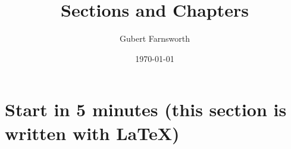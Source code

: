 \documentclass{article}
\title{Sections and Chapters}
\author{Gubert Farnsworth}
\date{\today}
\begin{document}
 
\maketitle
 
\section{Start in 5 minutes (this section is written with LaTeX)}
 

 
\end{document}
